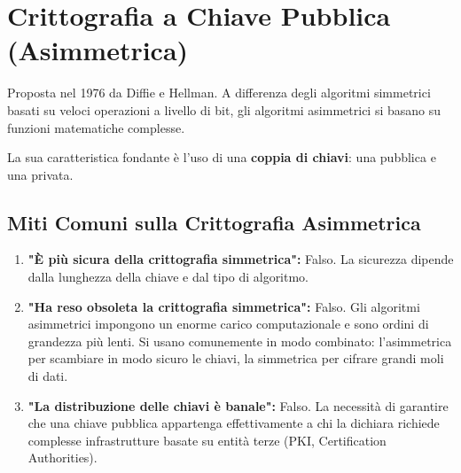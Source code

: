 \begin{center}
\end{center}


\section{Crittografia a Chiave Pubblica (Asimmetrica)}
Proposta nel 1976 da Diffie e Hellman. A differenza degli algoritmi simmetrici basati su veloci operazioni a livello di bit, gli algoritmi asimmetrici si basano su funzioni matematiche complesse.

La sua caratteristica fondante è l'uso di una \textbf{coppia di chiavi}: una pubblica e una privata.

\subsection{Miti Comuni sulla Crittografia Asimmetrica}
\begin{warnbox}
\begin{enumerate}
    \item \textbf{"È più sicura della crittografia simmetrica":} Falso. La sicurezza dipende dalla lunghezza della chiave e dal tipo di algoritmo.
    \item \textbf{"Ha reso obsoleta la crittografia simmetrica":} Falso. Gli algoritmi asimmetrici impongono un enorme carico computazionale e sono ordini di grandezza più lenti. Si usano comunemente in modo combinato: l'asimmetrica per scambiare in modo sicuro le chiavi, la simmetrica per cifrare grandi moli di dati.
    \item \textbf{"La distribuzione delle chiavi è banale":} Falso. La necessità di garantire che una chiave pubblica appartenga effettivamente a chi la dichiara richiede complesse infrastrutture basate su entità terze (PKI, Certification Authorities).
\end{enumerate}
\end{warnbox}

